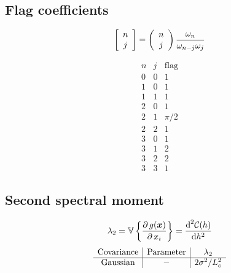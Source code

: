 \documentclass[a4paper,12pt]{article}
\begin{document}
\subsection{Flag coefficients}
\begin{minipage}{0.5\linewidth}
\begin{equation}
  \left[ \begin{array}{c} n \\ j \end{array} \right] = 
  \left( \begin{array}{c} n \\ j \end{array} \right)\frac{\omega_n}{\omega_{n-j}\omega_j}
\end{equation}
\end{minipage}
\begin{minipage}{0.5\linewidth}
\begin{equation}
  \begin{array}{c|c|c}
    n & j & \text{flag} \\
    \hline
    0 & 0 & 1\\
    1 & 0 & 1\\
    1 & 1 & 1\\
    2 & 0 & 1\\
    2 & 1 & \pi/2\\
    2 & 2 & 1\\
    3 & 0 & 1\\
    3 & 1 & 2\\
    3 & 2 & 2\\
    3 & 3 & 1
  \end{array}
\end{equation}
\end{minipage}

\subsection{Second spectral moment}
\begin{equation}
  \lambda_2=\mathbb{V}\left\{\frac{\partial\, g(\boldsymbol{x})}{\partial\, x_i}\right\}= \frac{\text{d}^2\mathcal{C}(h)}{\text{d}h^2}
\end{equation}
\begin{equation}
  \begin{array}{c|c|c}
    \text{Covariance} & \text{Parameter} & \lambda_2 \\
    \hline
    \text{Gaussian} & - & 2\sigma^2/L_c^2\\
  \end{array}
\end{equation}
\end{document}
